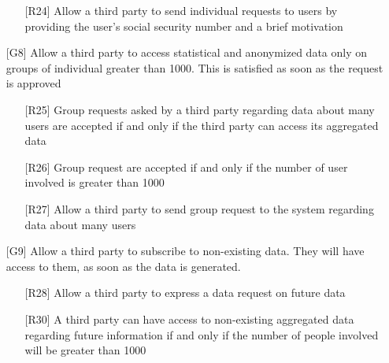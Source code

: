 \begin{itemize}
\begin{itemize}
	\item[{[R24]}] Allow a third party to send individual requests to users by providing the user's social security number and a brief motivation
	\end{itemize}
\item[{[G8]}] Allow a third party to access statistical and anonymized data only on groups of individual greater than 1000. This is satisfied as soon as the request is approved
	\begin{itemize}
	\item[{[R25]}] Group requests asked by a third party regarding data about many users are accepted if and only if the third party can access its aggregated data
	\item[{[R26]}] Group request are accepted if and only if the number of user involved is greater than 1000
	\item[{[R27]}] Allow a third party to send group request to the system regarding data about many users
	\end{itemize}
\item[{[G9]}] Allow a third party to subscribe to non-existing data. They will have access to them, as soon as the data is generated. 
	\begin{itemize}
	\item[{[R28]}] Allow a third party to express a data request on future data
	\item[{[R30]}] A third party can have access to non-existing aggregated data regarding future information if and only if the number of people involved will be greater than 1000
	\end{itemize}
\end{itemize}

